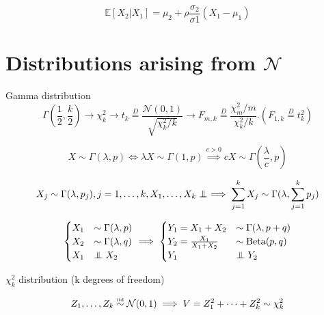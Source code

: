 \documentclass[twocolumn]{amsart}
\newcommand{\E}{\mathbb{E}}
\newcommand{\Beta}{\operatorname{Beta}}
\newcommand\iid{\mathrel{\overset{\makebox[0pt]{\mbox{\normalfont\tiny iid}}}{\sim}}}
\newcommand\independent{\protect\mathpalette{\protect\independenT}{\perp}}
\def\independenT#1#2{\mathrel{\rlap{$#1#2$}\mkern3mu{#1#2}}}
\begin{document}
\begin{equation*}
  \E[X_{2} | X_{1}] = \mu_{2} + \rho \frac{\sigma_{2}}{\sigma{1}}(X_{1} - \mu_{1})
\end{equation*}


\section*{Distributions arising from $\mathcal{N}$}
Gamma distribution
\begin{equation*}
  \Gamma\left(\frac{1}{2},\frac{k}{2}\right) \rightarrow \chi_{k}^{2}
  \rightarrow t_{k} \stackrel{D}{=}
  \frac{\mathcal{N}(0,1)}{\sqrt{\chi_{k}^{2}/k}} \rightarrow F_{m,k}
  \stackrel{D}{=} \frac{\chi_{m}^{2}/m}{\chi_{k}^{2}/k}.
  (F_{1,k} \stackrel{D}{=} t_{k}^{2})
\end{equation*}

\begin{equation*}
  X\sim\Gamma(\lambda,p) \iff \lambda X \sim \Gamma(1,p)
  \stackrel{c>0}{\implies} cX\sim \Gamma(\frac{\lambda}{c},p)
\end{equation*}

\begin{equation*}
  X_{j}\sim \Gamma(\lambda, p_{j}), j=1,\ldots,k, X_{1},\ldots,X_{k}
  \independent \implies \sum_{j=1}^{k}X_{j} \sim \Gamma(\lambda, \sum_{j=1}^{k}p_{j})
\end{equation*}

\begin{equation*}
  \begin{cases}
    X_{1} & \sim \Gamma(\lambda, p) \\
    X_{2} & \sim \Gamma(\lambda, q) \\
    X_{1} & \independent X_{2}
  \end{cases}
  \implies
  \begin{cases}
    Y_{1} = X_{1} + X_{2} & \sim \Gamma(\lambda, p + q) \\
    Y_{2} = \frac{X_{1}}{X_{1} + X_{2}} & \sim \Beta(p, q) \\
    Y_{1} & \independent Y_{2}
  \end{cases}
\end{equation*}

$\chi_{k}^{2}$ distribution (k degrees of freedom)

\begin{equation*}
  Z_{1},\ldots,Z_{k}\iid\mathcal{N}(0,1) \implies V =
  Z^{2}_{1}+\cdots+Z^{2}_{k} \sim \chi_{k}^{2}
\end{equation*}
\end{document}
